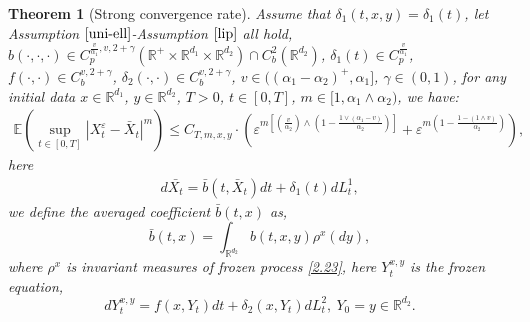 \documentclass[11pt,reqno]{amsart}
\newtheorem{theorem}{\indent Theorem}[section]
\newtheorem{remark}{\indent Remark}[section]
\numberwithin{equation}{section}
\newcommand{\de}{\delta}
\newcommand{\mb}{\mathbb}
\begin{document}
\begin{theorem}[Strong convergence rate]\label{SCR}
Assume that $\delta_{1}(t,x,y)=\delta_{1}(t)$, let Assumption $\ref{uni-ell}$-Assumption $\ref{lip}$ all hold,  $b(\cdot,\cdot,\cdot)\in C_{p}^{\frac{v}{\alpha_{1}},v,2+\gamma}(\mb{R}^{+}\times\mathbb{R}^{d_{1}}\times\mathbb{R}^{d_{2}})\cap C_b^{2}(\mathbb{R}^{d_{2}})$, $\delta_{1}(t)\in C_{p}^{\frac{v}{\alpha_{1}}}$,  $f(\cdot,\cdot)\in C_{b}^{v, 2+\gamma}$, $\de_{2}(\cdot,\cdot)\in C_{b}^{v, 2+\gamma}$,  $v\in((\alpha_{1}-\alpha_{2})^{+},\alpha_{1}]$,  $\gamma\in (0,1)$, for any initial data $x\in \mathbb{R}^{d_{1}}$, $y\in \mathbb{R}^{d_{2}}$, $T>0$, $t\in[0,T]$, $m\in [1,\alpha_{1}\wedge\alpha_{2})$, %
we have:
\begin{align*}
\mathbb{E}\left( \sup_{t\in [0,T]}|X_{t}^{\varepsilon}-\bar{X}_{t}|^{m}\right) \leq   C_{T,m,x,y}\cdot\left(\varepsilon^{m\left[ \left( \frac{v}{\alpha_{2}}\right) \wedge \left( 1-\frac{1\vee(\alpha_{1}-v)}{\alpha_{2}}\right) \right] }+\varepsilon^{m(1-\frac{1-(1\wedge v)}{\alpha_{2}})}\right),
\end{align*}
here 
\begin{align*}
	d\bar{X_{t}}=\bar{b}(t,\bar{X}_{t})dt+\delta_{1}(t)dL_{t}^{1},
\end{align*}
we define the averaged coefficient $\bar{b}(t,x)$ as,  %
\begin{equation}\label{b}
\bar{b}(t,x)=\int_{\mathbb{R}^{d_{2}}}b(t,x,y)\rho^{x}(dy), %
\end{equation}
where $\rho^x$ is invariant measures of frozen process \eqref{2.23}, %
here $Y^{x,y}_{t}$ is the frozen equation, 
\begin{equation}\label{2.23}
	dY^{x,y}_{t}=f(x,Y_{t})dt+\delta_{2}(x,Y_{t})dL^{2}_{t},\ Y_{0}=y\in \mathbb{R}^{d_{2}}.
\end{equation}
\end{theorem}

\end{document}
